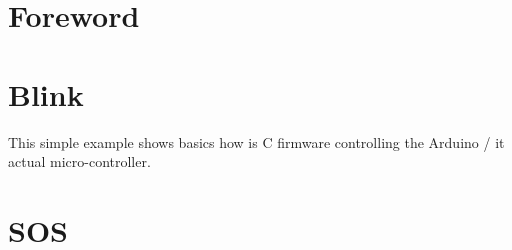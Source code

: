 
\section{Foreword}

\section{Blink}
This simple example shows basics how is C firmware controlling the Arduino / it actual micro-controller.

\section{SOS}


